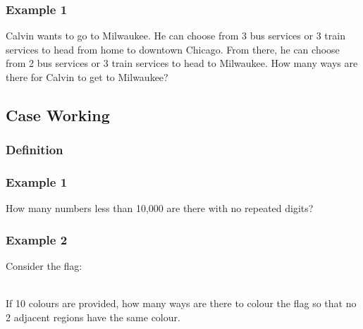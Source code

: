 \documentclass{article}
\begin{document}
\vspace{20px}
\pagebreak
\subsubsection{Example 1}
Calvin wants to go to Milwaukee. He can choose from 3 bus services or 3
train services to head from home to downtown Chicago. From there, he can choose
from 2 bus services or 3 train services to head to Milwaukee. How many ways are
there for Calvin to get to Milwaukee?
\vspace{30px}



\subsection{Case Working}
\subsubsection{Definition}
\vspace{20px}
\subsubsection{Example 1}
How many numbers less than 10,000 are there with no repeated digits?
\vspace{20px}

\subsubsection{Example 2}
Consider the flag:



\\
If 10 colours are provided, how many ways are there to colour the flag so that no 2 adjacent regions have the same colour.
\vspace{20px}
\end{document}
